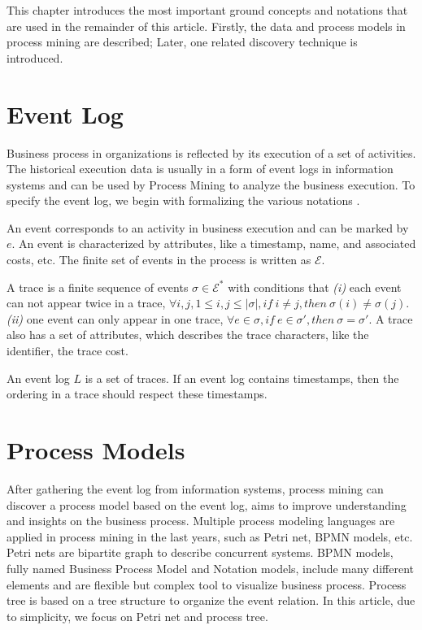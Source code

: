 This chapter introduces the most important ground concepts and notations that are used in the remainder of this article. Firstly, the data and process models in process mining are described; Later, one related discovery technique is introduced.
\section{Event Log}
Business process in organizations is reflected by its execution of a set of activities. The historical execution data is usually in a form of event logs in information systems and can be used by Process Mining to analyze the business execution. To specify the event log, we begin with formalizing the various notations\cite{van2016data} .
\begin{definition}[Event]
	An event corresponds to an activity in business execution and can be marked by $e$. An event is characterized by attributes, like a timestamp, name, and associated costs, etc. The finite set of events in the process is written as $\mathcal{E}$.
\end{definition}
\begin{definition}[Trace]
A trace is a finite sequence of events $\sigma \in \mathcal{E}^*$ with conditions that \emph{(i)} each event can not appear twice in a trace, $ \forall i,j, 1 \leq i,j \leq \vert \sigma \vert, if \ i \neq j, then\ \sigma (i) \neq \sigma (j) $.  \emph{(ii)} one event can only appear in one trace, $ \forall e \in \sigma, if\ e \in \sigma\prime, then\ \sigma = \sigma\prime $. 
A trace also has a set of attributes, which describes the trace characters, like the identifier, the trace cost.
\end{definition}
\begin{definition}
An event log $L$ is a set of traces. If an event log contains timestamps, then the ordering in a trace should respect these timestamps. 
\end{definition}
\section{Process Models}
After gathering the event log from information systems, process mining can discover a process model based on the event log, aims to improve understanding and insights on the business process. Multiple process modeling languages are applied in process mining in the last years, such as Petri net, BPMN models, etc. Petri nets are bipartite graph to describe concurrent systems. BPMN models, fully named Business Process Model and Notation models, include many different elements and are flexible but complex tool to visualize business process. Process tree is based on a tree structure to organize the event relation. In this article, due to simplicity, we focus on Petri net and process tree.
